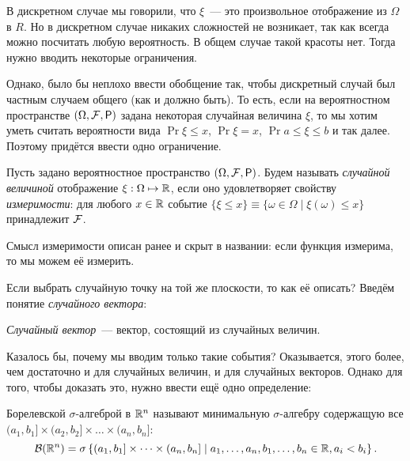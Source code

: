В дискретном случае мы говорили, что \(\xi\)~--- это произвольное отображение из \(\Omega\) в \(R\). Но в дискретном случае никаких сложностей не возникает, так как всегда можно посчитать любую вероятность. В общем случае такой красоты нет. Тогда нужно вводить некоторые ограничения.

Однако, было бы неплохо ввести обобщение так, чтобы дискретный случай был частным случаем общего (как и должно быть). То есть, если на вероятностном пространстве \((\Omega, \F, \Pr)\) задана некоторая случайная величина \(\xi\), то мы хотим уметь считать вероятности вида \(\Pr{\xi \leq x}\), \(\Pr{\xi = x}\), \(\Pr{a \leq \xi \leq b}\) и так далее. Поэтому придётся ввести одно ограничение. 

\begin{definition}
	Пусть задано вероятностное пространство \((\Omega, \F, \Pr)\). Будем называть \emph{случайной величиной} отображение \(\xi : \Omega \mapsto \mathbb{R}\), если оно удовлетворяет свойству \emph{измеримости}: для любого \(x \in \mathbb{R}\) событие \(\{\xi \leq x\} \equiv \{\omega \in \Omega \mid \xi(\omega) \leq x\}\) принадлежит \(\mathcal{F}\).
\end{definition}

Смысл измеримости описан ранее и скрыт в названии: если функция измерима, то мы можем её измерить.

Если выбрать случайную точку на той же плоскости, то как её описать? Введём понятие \emph{случайного вектора}:

\begin{definition}
    \emph{Случайный вектор}~--- вектор, состоящий из случайных величин.
\end{definition}

Казалось бы, почему мы вводим только такие события? Оказывается, этого более, чем достаточно и для случайных величин, и для случайных векторов. Однако для того, чтобы доказать это, нужно ввести ещё одно определение:

\begin{definition}
    Борелевской $\sigma$-алгеброй в $\mathbb{R}^n$ называют минимальную 
    $\sigma$-алгебру содержащую все \((a_1,  b_1] \times (a_2, b_2] \times 
    \dots \times (a_n, b_n]\):
    \[
    \mathcal{B}(\mathbb{R}^n) = \sigma\left\{(a_1, b_1] \times \dots \times (a_n, b_n] \mid a_1, \dots, a_n, b_1, \dots, b_n \in \mathbb{R}, a_i < b_i\right\}.
    \]
\end{definition}

